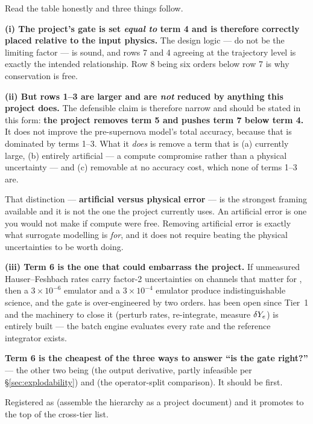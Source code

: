 Read the table honestly and three things follow.

\textbf{(i) The project's gate is set \emph{equal to} term 4 and is therefore
correctly placed relative to the input physics.} The design logic --- do not be
the limiting factor --- is sound, and rows 7 and 4 agreeing at the trajectory
level is exactly the intended relationship. Row 8 being six orders below row 7
is why conservation is free.

\textbf{(ii) But rows 1--3 are larger and are \emph{not} reduced by anything
this project does.} The defensible claim is therefore narrow and should be
stated in this form: \textbf{the project removes term 5 and pushes term 7 below
term 4.} It does not improve the pre-supernova model's total accuracy, because
that is dominated by terms 1--3. What it \emph{does} is remove a term that is
(a) currently large, (b) entirely artificial --- a compute compromise rather
than a physical uncertainty --- and (c) removable at no accuracy cost, which
none of terms 1--3 are.

That distinction --- \textbf{artificial versus physical error} --- is the
strongest framing available and it is not the one the project currently uses.
An artificial error is one you would not make if compute were free. Removing
artificial error is exactly what surrogate modelling is \emph{for}, and it does
not require beating the physical uncertainties to be worth doing.

\textbf{(iii) Term 6 is the one that could embarrass the project.} If
unmeasured Hauser--Feshbach rates carry factor-2 uncertainties on channels that
matter for \Ye, then a $3 \times 10^{-6}$ emulator and a $3 \times 10^{-4}$
emulator produce indistinguishable science, and the gate is over-engineered by
two orders.  has been open since Tier~1 and the machinery to
close it (perturb rates, re-integrate, measure $\delta Y_{e}$) is entirely built
--- the batch engine evaluates every rate and the reference integrator exists.

\textbf{Term 6 is the cheapest of the three ways to answer ``is the gate
right?''} --- the other two being  (the output derivative, partly
infeasible per \S\ref{sec:explodability}) and  (the
operator-split comparison). It should be first.

Registered as  (assemble the hierarchy as a project document) and it
promotes  to the top of the cross-tier list.
